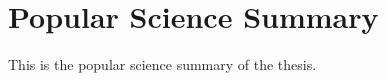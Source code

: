 \chapter{Popular Science Summary}
\label{chap:pop-sci-sum}

This is the popular science summary of the thesis.